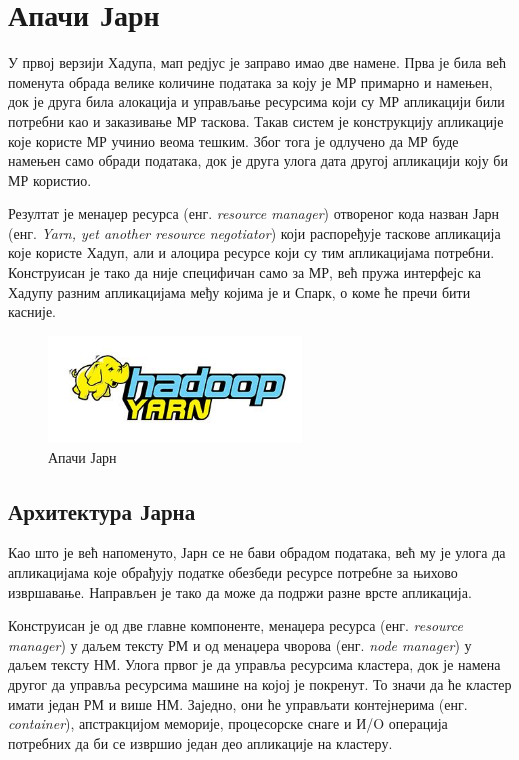\documentclass[12pt,oneside]{memoir}
\begin{document}
\section{Апачи Јарн}
\label{sec:yarn}

У првој верзији Хадупа, мап редјус је заправо имао две намене. Прва је била већ поменута обрада велике количине података за коју је МР примарно и намењен, док је друга била алокација и управљање ресурсима који су МР апликацији били потребни као и заказивање МР таскова. Такав систем је конструкцију апликације које користе МР учинио веома тешким. Због тога је одлучено да МР буде намењен само обради података, док је друга улога дата другој апликацији коју би МР користио. \cite{hadoop_learning}

Резултат је менаџер ресурса (енг. \textit{resource manager}) отвореног кода назван Јарн (енг. \textit{Yarn, yet another resource negotiator}) који распоређује таскове апликација које користе Хадуп, али и алоцира ресурсе који су тим апликацијама потребни. Конструисан је тако да није специфичан само за МР, већ пружа интерфејс ка Хадупу разним апликацијама међу којима је и Спарк, о коме ће пречи бити касније. \cite{hadoop_learning}

\begin{figure}[!ht]
  \centering
  \includegraphics[width=0.6\textwidth]{pictures/yarn_logo.jpg}
  \caption{Апачи Јарн}
  \label{fig:yarn_logo}
\end{figure}

\subsection{Архитектура Јарна}
\label{subsec:yern_arch}

Као што је већ напоменуто, Јарн се не бави обрадом података, већ му је улога да апликацијама које обрађују податке обезбеди ресурсе потребне за њихово извршавање. Направљен је тако да може да подржи разне врсте апликација. \cite{hadoop_learning}

Конструисан је од две главне компоненте, менаџера ресурса (енг. \textit{resource manager}) у даљем тексту РМ и од менаџера чворова (енг. \textit{node manager}) у даљем тексту НМ. Улога првог је да управља ресурсима кластера, док је намена другог да управља ресурсима машине на којој је покренут. То значи да ће кластер имати један РМ и више НМ. Заједно, они ће управљати контејнерима (енг. \textit{container}), апстракцијом меморије, процесорске снаге и И/O операција потребних да би се извршио један део апликације на кластеру. \cite{hadoop_learning}
\end{document}
